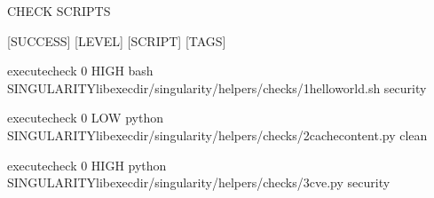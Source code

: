 \documentclass[letterpaper,10pt,english]{sphinxmanual}
\begin{document}
%
\begin{sphinxVerbatim}[commandchars=\\\{\}]
\PYGZsh{}\PYGZsh{}\PYGZsh{}\PYGZsh{}\PYGZsh{}\PYGZsh{}\PYGZsh{}\PYGZsh{}\PYGZsh{}\PYGZsh{}\PYGZsh{}\PYGZsh{}\PYGZsh{}\PYGZsh{}\PYGZsh{}\PYGZsh{}\PYGZsh{}\PYGZsh{}\PYGZsh{}\PYGZsh{}\PYGZsh{}\PYGZsh{}\PYGZsh{}\PYGZsh{}\PYGZsh{}\PYGZsh{}\PYGZsh{}\PYGZsh{}\PYGZsh{}\PYGZsh{}\PYGZsh{}\PYGZsh{}\PYGZsh{}\PYGZsh{}\PYGZsh{}\PYGZsh{}\PYGZsh{}\PYGZsh{}\PYGZsh{}\PYGZsh{}\PYGZsh{}\PYGZsh{}\PYGZsh{}\PYGZsh{}\PYGZsh{}\PYGZsh{}\PYGZsh{}\PYGZsh{}\PYGZsh{}\PYGZsh{}\PYGZsh{}\PYGZsh{}\PYGZsh{}\PYGZsh{}\PYGZsh{}\PYGZsh{}\PYGZsh{}\PYGZsh{}\PYGZsh{}\PYGZsh{}\PYGZsh{}\PYGZsh{}\PYGZsh{}\PYGZsh{}\PYGZsh{}\PYGZsh{}\PYGZsh{}\PYGZsh{}\PYGZsh{}\PYGZsh{}\PYGZsh{}\PYGZsh{}\PYGZsh{}\PYGZsh{}\PYGZsh{}\PYGZsh{}\PYGZsh{}\PYGZsh{}\PYGZsh{}\PYGZsh{}\PYGZsh{}\PYGZsh{}

\PYGZsh{} CHECK SCRIPTS

\PYGZsh{}\PYGZsh{}\PYGZsh{}\PYGZsh{}\PYGZsh{}\PYGZsh{}\PYGZsh{}\PYGZsh{}\PYGZsh{}\PYGZsh{}\PYGZsh{}\PYGZsh{}\PYGZsh{}\PYGZsh{}\PYGZsh{}\PYGZsh{}\PYGZsh{}\PYGZsh{}\PYGZsh{}\PYGZsh{}\PYGZsh{}\PYGZsh{}\PYGZsh{}\PYGZsh{}\PYGZsh{}\PYGZsh{}\PYGZsh{}\PYGZsh{}\PYGZsh{}\PYGZsh{}\PYGZsh{}\PYGZsh{}\PYGZsh{}\PYGZsh{}\PYGZsh{}\PYGZsh{}\PYGZsh{}\PYGZsh{}\PYGZsh{}\PYGZsh{}\PYGZsh{}\PYGZsh{}\PYGZsh{}\PYGZsh{}\PYGZsh{}\PYGZsh{}\PYGZsh{}\PYGZsh{}\PYGZsh{}\PYGZsh{}\PYGZsh{}\PYGZsh{}\PYGZsh{}\PYGZsh{}\PYGZsh{}\PYGZsh{}\PYGZsh{}\PYGZsh{}\PYGZsh{}\PYGZsh{}\PYGZsh{}\PYGZsh{}\PYGZsh{}\PYGZsh{}\PYGZsh{}\PYGZsh{}\PYGZsh{}\PYGZsh{}\PYGZsh{}\PYGZsh{}\PYGZsh{}\PYGZsh{}\PYGZsh{}\PYGZsh{}\PYGZsh{}\PYGZsh{}\PYGZsh{}\PYGZsh{}\PYGZsh{}\PYGZsh{}\PYGZsh{}\PYGZsh{}


\PYGZsh{}        [SUCCESS] [LEVEL]  [SCRIPT]                                                                         [TAGS]

execute\PYGZus{}check    0    HIGH  \PYGZdq{}bash \PYGZdl{}SINGULARITY\PYGZus{}libexecdir/singularity/helpers/checks/1\PYGZhy{}hello\PYGZhy{}world.sh\PYGZdq{}       security

execute\PYGZus{}check    0     LOW  \PYGZdq{}python \PYGZdl{}SINGULARITY\PYGZus{}libexecdir/singularity/helpers/checks/2\PYGZhy{}cache\PYGZhy{}content.py\PYGZdq{}   clean

execute\PYGZus{}check    0    HIGH  \PYGZdq{}python \PYGZdl{}SINGULARITY\PYGZus{}libexecdir/singularity/helpers/checks/3\PYGZhy{}cve.py\PYGZdq{}             security
\end{sphinxVerbatim}
\end{document}
